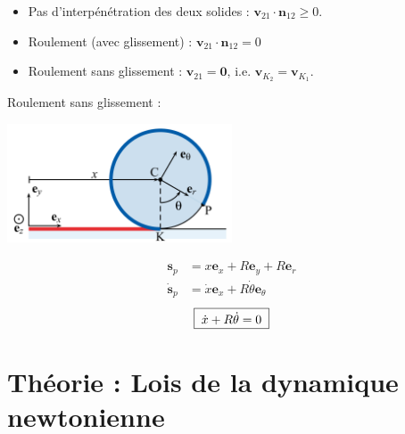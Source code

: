 \documentclass[a4paper]{article}
\begin{document}
\begin{itemize}
\begin{itemize}
\item Pas d’interpénétration des deux solides : $ \textbf{v}_{21} \cdot \textbf{n}_{12} \geq 0 $.
\item Roulement (avec glissement) : $ \textbf{v}_{21} \cdot \textbf{n}_{12} = 0 $
\item Roulement sans glissement : $ \textbf{v}_{21} = \textbf{0} $, i.e. $ \textbf{v}_{K_2} = \textbf{v}_{K_1} $.
\end{itemize}
Roulement sans glissement : 
\begin{center}
\includegraphics[width=0.5\textwidth]{images/Solides3.PNG}
\end{center}
\begin{align*}
\textbf{s}_p &= x \textbf{e}_x + R \textbf{e}_y + R \textbf{e}_r \\
\dot{\textbf{s}}_p &= \dot{x} \textbf{e}_x + R \dot{\theta} \textbf{e}_\theta
\end{align*}
\[ \fbox{$ \; \dot{x} + R \dot{\theta} = 0 \; $} \]





\end{itemize}




















\section{Théorie : Lois de la dynamique newtonienne}
\end{document}
